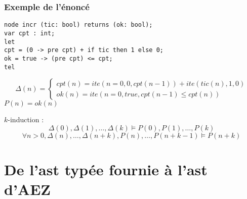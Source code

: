 \documentclass[18pt]{beamer}
\begin{document}
\begin{frame}[fragile]
\frametitle{Exemple de l'énoncé}
\begin{lstlisting}
node incr (tic: bool) returns (ok: bool);
var cpt : int;
let
cpt = (0 -> pre cpt) + if tic then 1 else 0;
ok = true -> (pre cpt) <= cpt;
tel
\end{lstlisting}

$$\Delta(n) =
\begin{cases}
cpt(n) = ite(n=0, 0, cpt(n-1)) + ite(tic(n), 1, 0)
\\
ok(n) = ite(n = 0, true, cpt(n - 1) \leq cpt(n))
\end{cases}
$$
\qquad$P(n) = ok(n)$

\vspace{2em}

	$k$-induction :
	$$\Delta(0), \Delta(1), \ldots, \Delta(k) \models  P(0), P(1), \ldots,  P(k)$$
	$$\forall n>0, {\Delta(n), \ldots, \Delta(n+k), P(n), \ldots, P(n+k-1) \models P(n+k)}$$

\end{frame}

\begin{frame}
\tableofcontents
\end{frame}

\section{De l'ast typée fournie à l'ast d'AEZ}
\end{document}
